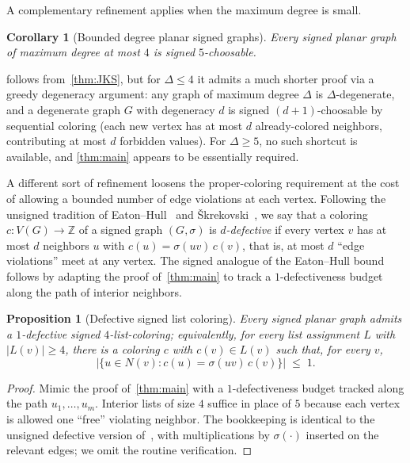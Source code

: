 \documentclass[11pt,a4paper]{article}
\theoremstyle{plain}
\newtheorem{proposition}[theorem]{Proposition}
\newtheorem{corollary}[theorem]{Corollary}
\theoremstyle{definition}
\newcommand{\Z}{\mathbb{Z}}
\newcommand{\V}{V}
\newcommand{\Gs}{(G,\sigma)}
\begin{document}
A complementary refinement applies when the maximum degree is small.

\begin{corollary}[Bounded degree planar signed graphs]\label{cor:subcubic}
Every signed planar graph of maximum degree at most $4$ is
signed $5$-choosable.
\end{corollary}

 follows from~\cref{thm:JKS}, but for
$\Delta\le 4$ it admits a much shorter proof via a greedy
degeneracy argument: any graph of maximum degree $\Delta$ is
$\Delta$-degenerate, and a degenerate graph $G$ with degeneracy
$d$ is signed $(d+1)$-choosable by sequential coloring (each new
vertex has at most $d$ already-colored neighbors, contributing at
most $d$ forbidden values). For $\Delta\ge 5$, no such shortcut is
available, and \cref{thm:main} appears to be essentially required.

A different sort of refinement loosens the proper-coloring
requirement at the cost of allowing a bounded number of edge
violations at each vertex. Following the unsigned tradition of
Eaton--Hull~\cite{EatonHull1999} and
\v{S}krekovski~\cite{Skrekovski1999}, we say that a coloring
$c\colon\V(G)\to\Z$ of a signed graph $\Gs$ is \emph{$d$-defective}
if every vertex $v$ has at most $d$ neighbors $u$ with
$c(u)=\sigma(uv)\,c(v)$, that is, at most $d$ ``edge violations''
meet at any vertex. The signed analogue of the Eaton--Hull bound
follows by adapting the proof of~\cref{thm:main} to track a
$1$-defectiveness budget along the path of interior neighbors.

\begin{proposition}[Defective signed list coloring]\label{prop:defective}
Every signed planar graph admits a $1$-defective signed
$4$-list-coloring; equivalently, for every list assignment $L$ with
$|L(v)|\ge 4$, there is a coloring $c$ with $c(v)\in L(v)$ such
that, for every $v$,
\[
   |\{u\in N(v) : c(u)=\sigma(uv)\,c(v)\}| \;\le\; 1.
\]
\end{proposition}

\begin{proof}
Mimic the proof of~\cref{thm:main} with a $1$-defectiveness budget
tracked along the path $u_1,\dots,u_m$. Interior lists of size $4$
suffice in place of $5$ because each vertex is allowed one
``free'' violating neighbor. The bookkeeping is identical to the
unsigned defective version of~\cite{EatonHull1999,Skrekovski1999},
with multiplications by $\sigma(\cdot)$ inserted on the relevant
edges; we omit the routine verification.
\end{proof}
\end{document}
